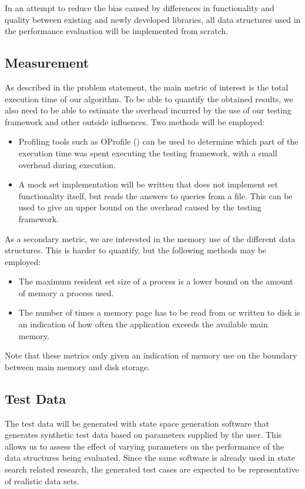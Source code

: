 \documentclass{acm_proc_article-sp}
\begin{document}
In an attempt to reduce the bias caused by differences in functionality and quality between existing and newly developed libraries, all data structures used in the performance evaluation will be implemented from scratch.

\subsection{Measurement}
As described in the problem statement, the main metric of interest is the total execution time of our algorithm. To be able to quantify the obtained results, we also need to be able to estimate the overhead incurred by the use of our testing framework and other outside influences. Two methods will be employed:
\begin{itemize}
\item Profiling tools such as OProfile (\cite{oprofile}) can be used to determine which part of the execution time was spent executing the testing framework, with a small overhead during execution.
\item A mock set implementation will be written that does not implement set functionality itself, but reads the answers to queries from a file. This can be used to give an upper bound on the overhead caused by the testing framework.
\end{itemize}

As a secondary metric, we are interested in the memory use of the different data structures. This is harder to quantify, but the following methods may be employed:
\begin{itemize}
\item The maximum resident set size of a process is a lower bound on the amount of memory a process used.
\item The number of times a memory page has to be read from or written to disk is an indication of how often the application exceeds the available main memory.
\end{itemize}
Note that these metrics only given an indication of memory use on the boundary between main memory and disk storage.

\subsection{Test Data}
The test data will be generated with state space generation software that generates synthetic test data based on parameters supplied by the user. This allows us to assess the effect of varying parameters on the performance of the data structures being evaluated. Since the same software is already used in state search related research, the generated test cases are expected to be representative of realistic data sets.
\end{document}
